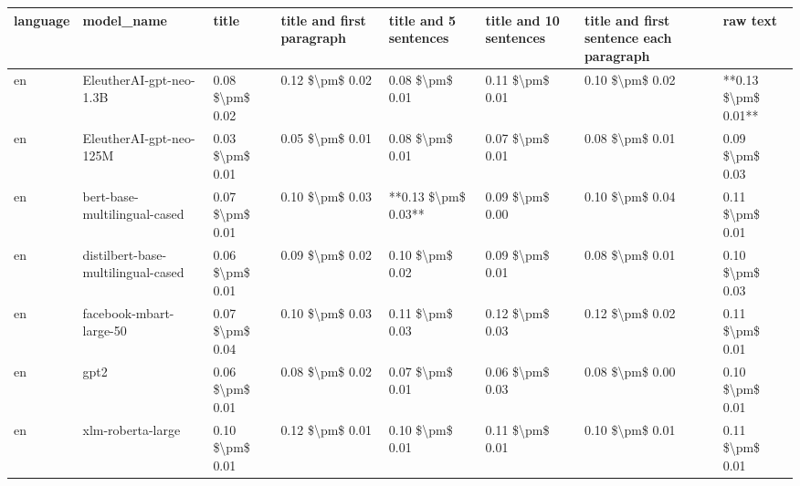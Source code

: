 \begin{tabular}{llllllll}
\toprule
language &                         model\_name &           title & title and first paragraph & title and 5 sentences & title and 10 sentences & title and first sentence each paragraph &            raw text \\
\midrule
      en &            EleutherAI-gpt-neo-1.3B & 0.08 \$\textbackslash pm\$ 0.02 &           0.12 \$\textbackslash pm\$ 0.02 &       0.08 \$\textbackslash pm\$ 0.01 &        0.11 \$\textbackslash pm\$ 0.01 &                         0.10 \$\textbackslash pm\$ 0.02 & **0.13 \$\textbackslash pm\$ 0.01** \\
      en &            EleutherAI-gpt-neo-125M & 0.03 \$\textbackslash pm\$ 0.01 &           0.05 \$\textbackslash pm\$ 0.01 &       0.08 \$\textbackslash pm\$ 0.01 &        0.07 \$\textbackslash pm\$ 0.01 &                         0.08 \$\textbackslash pm\$ 0.01 &     0.09 \$\textbackslash pm\$ 0.03 \\
      en &       bert-base-multilingual-cased & 0.07 \$\textbackslash pm\$ 0.01 &           0.10 \$\textbackslash pm\$ 0.03 &   **0.13 \$\textbackslash pm\$ 0.03** &        0.09 \$\textbackslash pm\$ 0.00 &                         0.10 \$\textbackslash pm\$ 0.04 &     0.11 \$\textbackslash pm\$ 0.01 \\
      en & distilbert-base-multilingual-cased & 0.06 \$\textbackslash pm\$ 0.01 &           0.09 \$\textbackslash pm\$ 0.02 &       0.10 \$\textbackslash pm\$ 0.02 &        0.09 \$\textbackslash pm\$ 0.01 &                         0.08 \$\textbackslash pm\$ 0.01 &     0.10 \$\textbackslash pm\$ 0.03 \\
      en &            facebook-mbart-large-50 & 0.07 \$\textbackslash pm\$ 0.04 &           0.10 \$\textbackslash pm\$ 0.03 &       0.11 \$\textbackslash pm\$ 0.03 &        0.12 \$\textbackslash pm\$ 0.03 &                         0.12 \$\textbackslash pm\$ 0.02 &     0.11 \$\textbackslash pm\$ 0.01 \\
      en &                               gpt2 & 0.06 \$\textbackslash pm\$ 0.01 &           0.08 \$\textbackslash pm\$ 0.02 &       0.07 \$\textbackslash pm\$ 0.01 &        0.06 \$\textbackslash pm\$ 0.03 &                         0.08 \$\textbackslash pm\$ 0.00 &     0.10 \$\textbackslash pm\$ 0.01 \\
      en &                  xlm-roberta-large & 0.10 \$\textbackslash pm\$ 0.01 &           0.12 \$\textbackslash pm\$ 0.01 &       0.10 \$\textbackslash pm\$ 0.01 &        0.11 \$\textbackslash pm\$ 0.01 &                         0.10 \$\textbackslash pm\$ 0.01 &     0.11 \$\textbackslash pm\$ 0.01 \\

\end{tabular}
